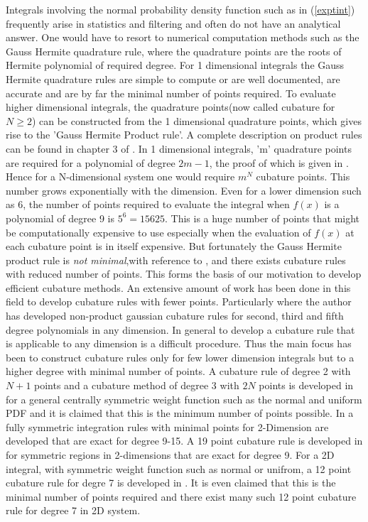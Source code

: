 \documentclass[letterpaper, 10 pt, conference]{ieeeconf}  %
\begin{document}
\indent\indent Integrals involving the normal probability density function such as in (\ref{exptint}) frequently arise in statistics and filtering and often do not have an analytical answer. One would have to resort to numerical computation methods such as the Gauss Hermite quadrature rule, where the quadrature points are the roots of Hermite polynomial of required degree. For 1 dimensional integrals the Gauss Hermite quadrature rules are simple to compute or are well documented, are accurate and are by far the minimal number of points required. To evaluate higher dimensional integrals, the quadrature points(now called cubature for $N\ge2$) can be constructed from the 1 dimensional quadrature points, which gives rise to the 'Gauss Hermite Product rule'. A complete description on product rules can be found in chapter 3 of \cite{c1}. In 1 dimensional integrals, 'm' quadrature points are required for a polynomial of degree $2m-1$, the proof of which is given in \cite{c1}. Hence for a N-dimensional system one would require $m^N$ cubature points. This number grows exponentially with the dimension. Even for a lower dimension such as 6, the number of points required to evaluate the integral when $f(x)$ is a polynomial of degree 9 is $5^6=15625$. This is a huge number of points that might be computationally expensive to use especially when the evaluation of $f(x)$ at each cubature point is in itself expensive. But fortunately the Gauss Hermite product rule is \emph{not minimal},with reference to \cite{c1}, and there exists cubature rules with reduced number of points. This forms the basis of our motivation to develop efficient cubature methods.\newline
 \indent\indent An extensive amount of work has been done in this field to develop cubature rules with fewer points. Particularly \cite{c2} where the author has developed non-product gaussian cubature rules for second, third and fifth degree polynomials in any dimension. In general to develop a cubature rule that is applicable to any dimension is a difficult procedure. Thus the main focus has been to construct cubature rules only for few lower dimension integrals but to a higher degree with minimal number of points. A cubature rule of degree 2 with $N+1$ points and a cubature method of degree 3 with $2N$ points is developed in \cite{c3} for a general centrally symmetric weight function such as the normal and uniform PDF and it is claimed that this is the minimum number of points possible. In \cite{c4} a fully symmetric integration rules with minimal points for 2-Dimension are developed that are exact for degree 9-15.  A 19 point cubature rule is developed in \cite{c5} for symmetric regions in 2-dimensions that are exact for degree 9. For a 2D integral, with symmetric weight function such as normal or unifrom, a 12 point cubature rule for degre 7  is developed in \cite{c6}. It is even claimed that this is the minimal number of points required and there exist many such 12 point cubature rule for degree 7 in 2D system.\newline
\end{document}
